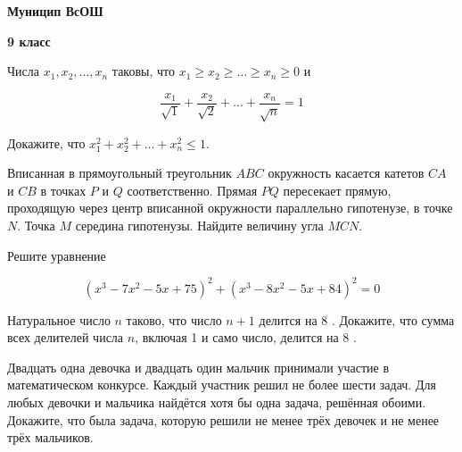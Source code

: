 \centerline{\bf \Huge Муницип ВсОШ}
\centerline{\bf \Huge 9 класс}

\begin{flushright}
        \scriptsize{}
\end{flushright}

Числа $x_1, x_2, \ldots, x_n$ таковы, что $x_1 \geqslant x_2 \geqslant \ldots \geqslant x_n \geqslant 0$ и

$$
\frac{x_1}{\sqrt{1}}+\frac{x_2}{\sqrt{2}}+\ldots+\frac{x_n}{\sqrt{n}}=1
$$


Докажите, что $x_1^2+x_2^2+\ldots+x_n^2 \leqslant 1$.

Вписанная в прямоугольный треугольник $A B C$ окружность касается катетов $C A$ и $C B$ в точках $P$ и $Q$ соответственно. Прямая $P Q$ пересекает прямую, проходящую через центр вписанной окружности параллельно гипотенузе, в точке $N$. Точка $M$ середина гипотенузы. Найдите величину угла $M C N$.

Решите уравнение

$$
\left(x^3-7 x^2-5 x+75\right)^2+\left(x^3-8 x^2-5 x+84\right)^2=0
$$


Натуральное число $n$ таково, что число $n+1$ делится на 8 . Докажите, что сумма всех делителей числа $n$, включая 1 и само число, делится на 8 .

Двадцать одна девочка и двадцать один мальчик принимали участие в математическом конкурсе. Каждый участник решил не более шести задач. Для любых девочки и мальчика найдётся хотя бы одна задача, решённая обоими. Докажите, что была задача, которую решили не менее трёх девочек и не менее трёх мальчиков.